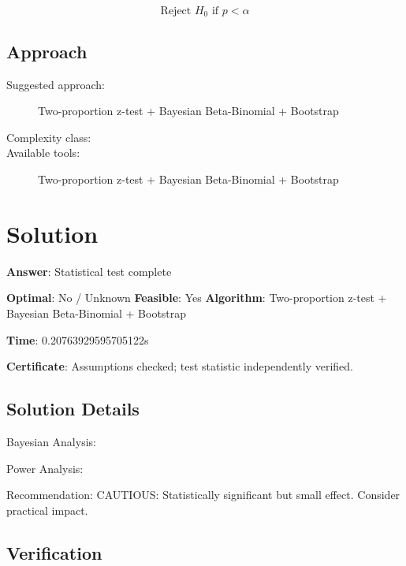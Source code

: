 \documentclass[11pt, a4paper]{article}
\begin{document}
\begin{equation}
\text{Reject } H_0 \text{ if } p < \alpha
\end{equation}

\subsection{Approach}

\begin{description}
  \item[Suggested approach:] Two-proportion z-test + Bayesian Beta-Binomial + Bootstrap
  \item[Complexity class:] 
  \item[Available tools:] Two-proportion z-test + Bayesian Beta-Binomial + Bootstrap
\end{description}
\section{Solution}

\begin{polyaresult}

\textbf{Answer}: Statistical test complete


\textbf{Optimal}: No / Unknown \hfill
\textbf{Feasible}: Yes
\textbf{Algorithm}: Two-proportion z-test + Bayesian Beta-Binomial + Bootstrap \quad $$

\textbf{Time}: 0.20763929595705122s

\textbf{Certificate}: Assumptions checked; test statistic independently verified.

\end{polyaresult}

\subsection{Solution Details}


Bayesian Analysis:

Power Analysis:

Recommendation: CAUTIOUS: Statistically significant but small effect. Consider practical impact.

\subsection{Verification}
\end{document}
